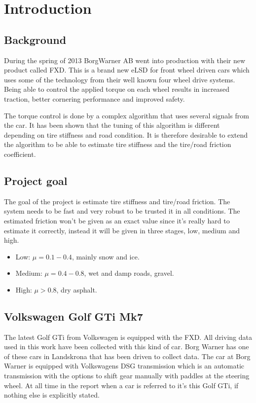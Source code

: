 \chapter{Introduction}

\section{Background}
During the spring of 2013 BorgWarner AB went into production with their new product called FXD. This is a brand new eLSD for front wheel driven cars which uses some of the technology from their well known four wheel drive systems. Being able to control the applied torque on each wheel results in increased traction, better cornering performance and improved safety.

The torque control is done by a complex algorithm that uses several signals from the car. It has been shown that the tuning of this algorithm is different depending on tire stiffness and road condition. It is therefore desirable to extend the algorithm to be able to estimate tire stiffness and the tire/road friction coefficient.

\section{Project goal}
The goal of the project is estimate tire stiffness and tire/road friction. The system needs to be fast and very robust to be trusted it in all conditions. The estimated friction won't be given as an exact value since it's really hard to estimate it correctly, instead it will be given in three stages, low, medium and high.

\begin{itemize}
	\item Low: $ \mu = 0.1-0.4 $, mainly snow and ice.
	\item Medium: $ \mu = 0.4-0.8 $, wet and damp roads, gravel.
	\item High: $ \mu > 0.8 $, dry asphalt.
\end{itemize}

\section{Volkswagen Golf GTi Mk7}
The latest Golf GTi from Volkswagen is equipped with the FXD. All driving data used in this work have been collected with this kind of car. Borg Warner has one of these cars in Landskrona that has been driven to collect data. The car at Borg Warner is equipped with Volkswagens DSG transmission which is an automatic transmission with the options to shift gear manually with paddles at the steering wheel. At all time in the report when a car is referred to it's this Golf GTi, if nothing else is explicitly stated.